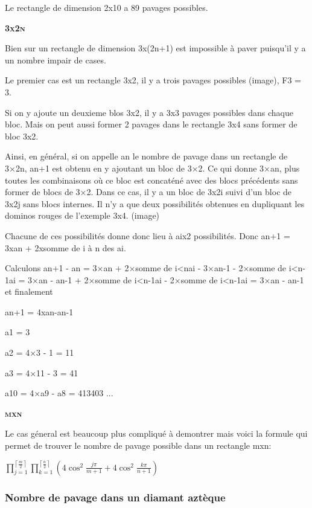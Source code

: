 \documentclass{article}
\begin{document}
Le rectangle de dimension 2x10 a 89 pavages possibles.



\textbf{\textsc{3x2n}}


Bien sur un rectangle de dimension 3x(2n+1) est impossible à paver puisqu'il y a un nombre impair de cases.

Le premier cas est un rectangle 3x2, il y a trois pavages possibles (image), F3 = 3.

Si on y ajoute un deuxieme blos 3x2, il y a 3x3 pavages possibles dans chaque bloc.
Mais on peut aussi former 2 pavages dans le rectangle 3x4 sans former de bloc 3x2.

Ainsi, en général, si on appelle an le nombre de pavage dans un rectangle de 3×2n, an+1 est obtenu en y ajoutant un bloc de 3×2.
Ce qui donne 3×an, plus toutes les combinaisons où ce bloc est concaténé avec des blocs précédents sans former de blocs de 3×2.
Dans ce cas, il y a un bloc de 3x2i suivi d'un bloc de 3x2j sans blocs internes. Il n'y a que deux possibilités obtenues en dupliquant les dominos rouges de l'exemple 3x4. (image)

Chacune de ces possibilités donne donc lieu à aix2 possibilités.
Donc an+1 = 3xan + 2xsomme de i à n des ai.

Calculons an+1 - an = 3×an + 2×somme de i<nai - 3×an-1 - 2×somme de i<n-1ai = 3×an - an-1 + 2×somme de i<n-1ai - 2×somme de i<n-1ai = 3×an - an-1 et finalement

an+1 = 4xan-an-1

a1 = 3

a2 = 4×3 - 1 = 11

a3 = 4×11 - 3 = 41

a10 = 4×a9 - a8 = 413403 ...


\textbf{\textsc{mxn}}

Le cas géneral est beaucoup plus compliqué à demontrer mais voici la formule qui permet de trouver le nombre de pavage possible dans un rectangle mxn:

\begin{center}
    $\prod_{j=1}^{\left \lceil \frac{m}{2} \right \rceil} \prod_{k=1}^{\left \lceil \frac{n}{2} \right \rceil}\left ( 4\cos^{2}\frac{j\pi }{m+1}+4\cos^{2}\frac{k\pi }{n+1} \right )$
\end{center}


\subsubsection{Nombre de pavage dans un diamant aztèque}
\end{document}

